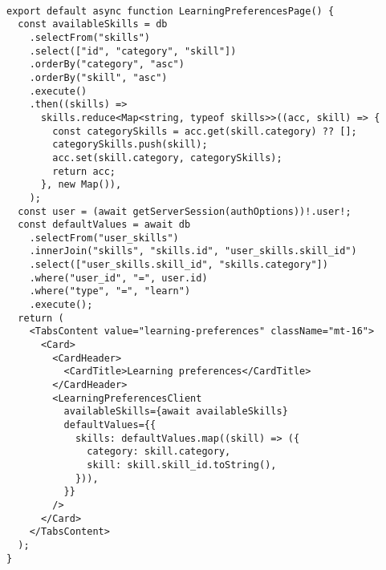 \begin{verbatim}

export default async function LearningPreferencesPage() {
  const availableSkills = db
    .selectFrom("skills")
    .select(["id", "category", "skill"])
    .orderBy("category", "asc")
    .orderBy("skill", "asc")
    .execute()
    .then((skills) =>
      skills.reduce<Map<string, typeof skills>>((acc, skill) => {
        const categorySkills = acc.get(skill.category) ?? [];
        categorySkills.push(skill);
        acc.set(skill.category, categorySkills);
        return acc;
      }, new Map()),
    );
  const user = (await getServerSession(authOptions))!.user!;
  const defaultValues = await db
    .selectFrom("user_skills")
    .innerJoin("skills", "skills.id", "user_skills.skill_id")
    .select(["user_skills.skill_id", "skills.category"])
    .where("user_id", "=", user.id)
    .where("type", "=", "learn")
    .execute();
  return (
    <TabsContent value="learning-preferences" className="mt-16">
      <Card>
        <CardHeader>
          <CardTitle>Learning preferences</CardTitle>
        </CardHeader>
        <LearningPreferencesClient
          availableSkills={await availableSkills}
          defaultValues={{
            skills: defaultValues.map((skill) => ({
              category: skill.category,
              skill: skill.skill_id.toString(),
            })),
          }}
        />
      </Card>
    </TabsContent>
  );
}
\end{verbatim}